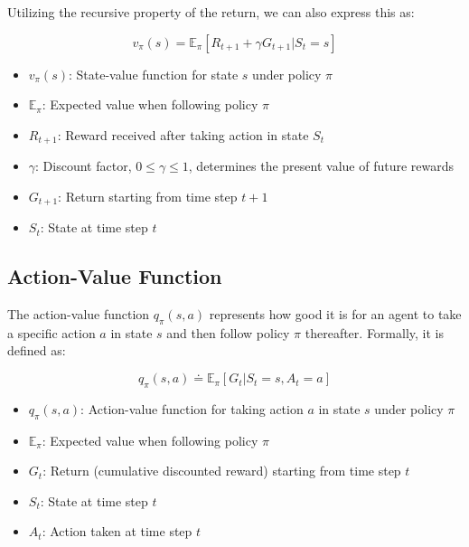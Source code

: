\documentclass{article}
\begin{document}
Utilizing the recursive property of the return, we can also express this as:

\begin{equation}
v_\pi(s) = \mathbb{E}_\pi[R_{t+1} + \gamma G_{t+1}|S_t = s]
\end{equation}

\begin{tcolorbox}[colframe=blue!50!black, colback=blue!10, title=Notation Overview]
\begin{itemize}
    \item $v_\pi(s)$: State-value function for state $s$ under policy $\pi$
    \item $\mathbb{E}_\pi$: Expected value when following policy $\pi$
    \item $R_{t+1}$: Reward received after taking action in state $S_t$
    \item $\gamma$: Discount factor, $0 \leq \gamma \leq 1$, determines the present value of future rewards
    \item $G_{t+1}$: Return starting from time step $t+1$
    \item $S_t$: State at time step $t$
\end{itemize}
\end{tcolorbox}

\subsection{Action-Value Function}

The action-value function $q_\pi(s,a)$ represents how good it is for an agent to take a specific action $a$ in state $s$ and then follow policy $\pi$ thereafter. Formally, it is defined as:

\begin{equation}
q_\pi(s,a) \doteq \mathbb{E}_\pi[G_t|S_t = s, A_t = a]
\end{equation}

\begin{tcolorbox}[colframe=blue!50!black, colback=blue!10, title=Notation Overview]
\begin{itemize}
    \item $q_\pi(s,a)$: Action-value function for taking action $a$ in state $s$ under policy $\pi$
    \item $\mathbb{E}_\pi$: Expected value when following policy $\pi$
    \item $G_t$: Return (cumulative discounted reward) starting from time step $t$
    \item $S_t$: State at time step $t$
    \item $A_t$: Action taken at time step $t$
\end{itemize}
\end{tcolorbox}
\end{document}
